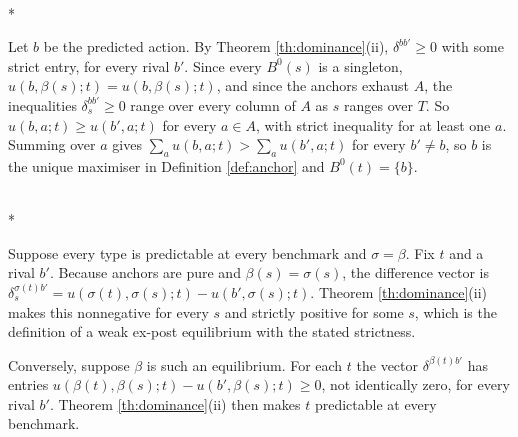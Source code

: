 \documentclass[12pt]{article}
\makeatletter
\theoremstyle{definition}
\renewenvironment{proof}[1][\proofname]{\par
  \pushQED{\qed}%
  \normalfont \topsep6\p@\@plus6\p@\relax
  \trivlist
  \item[\hskip\labelsep\itshape #1\@addpunct{.}]\mbox{}\\*
  \ignorespaces
}{%
  \popQED\endtrivlist\@endpefalse
}
\makeatother
\begin{document}
\begin{proof}[Proof of Corollary \ref{cor:coverage}]
Let $b$ be the predicted action. By Theorem \ref{th:dominance}(ii), $\delta^{bb'} \ge 0$ with some strict entry, for every rival $b'$. Since every $B^0(s)$ is a singleton, $u(b, \beta(s); t) = u(b, \beta(s); t)$, and since the anchors exhaust $A$, the inequalities $\delta^{bb'}_s \ge 0$ range over every column of $A$ as $s$ ranges over $T$. So $u(b, a; t) \ge u(b', a; t)$ for every $a \in A$, with strict inequality for at least one $a$. Summing over $a$ gives $\sum_a u(b, a; t) > \sum_a u(b', a; t)$ for every $b' \neq b$, so $b$ is the unique maximiser in Definition \ref{def:anchor} and $B^0(t) = \{b\}$.
\end{proof}

\begin{proof}[Proof of Corollary \ref{cor:expost}]
Suppose every type is predictable at every benchmark and $\sigma = \beta$. Fix $t$ and a rival $b'$. Because anchors are pure and $\beta(s) = \sigma(s)$, the difference vector is $\delta^{\sigma(t) b'}_s = u(\sigma(t), \sigma(s); t) - u(b', \sigma(s); t)$. Theorem \ref{th:dominance}(ii) makes this nonnegative for every $s$ and strictly positive for some $s$, which is the definition of a weak ex-post equilibrium with the stated strictness.

Conversely, suppose $\beta$ is such an equilibrium. For each $t$ the vector $\delta^{\beta(t) b'}$ has entries $u(\beta(t), \beta(s); t) - u(b', \beta(s); t) \ge 0$, not identically zero, for every rival $b'$. Theorem \ref{th:dominance}(ii) then makes $t$ predictable at every benchmark.
\end{proof}
\end{document}
